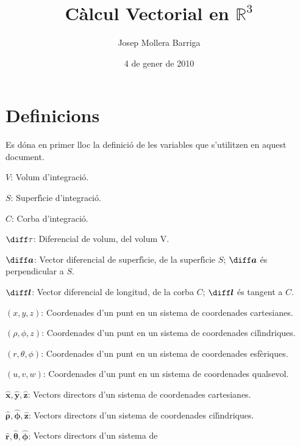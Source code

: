 \documentclass[catalan,a4paper,twoside,11pt]{article}
\begin{document}
\title{C\`{a}lcul Vectorial en $\mathbb{R}^3$}
\author{Josep Mollera Barriga}
\date{4 de gener de 2010}
\maketitle



\section{Definicions}

Es d\'{o}na  en primer lloc la definici\'{o} de les variables que s'utilitzen en aquest document.

\begin{list}{}
{\setlength{\labelwidth}{16mm}
\setlength{\leftmargin}{18mm}\setlength{\labelsep}{2mm}}
   \item[$V$:] Volum d'integraci\'{o}.
   \item[$S$:] Superf\'{\i}cie d'integraci\'{o}.
   \item[$C$:] Corba d'integraci\'{o}.
   \item[$\diff\tau$:] Diferencial de volum, del volum V.
   \item[$\boldsymbol{\diff a}$:] Vector diferencial de superf\'{\i}cie, de la superf\'{\i}cie
   $S$; $\boldsymbol{\diff a}$ \'{e}s perpendicular a $S$.
   \item[$\boldsymbol{\diff l}$:] Vector diferencial de longitud, de la corba
   $C$; $\boldsymbol{\diff l}$ \'{e}s tangent a $C$.
   \item[$(x,y,z)$:] Coordenades d'un punt en un sistema de
   coordenades cartesianes.
   \item[$(\rho,\phi,z)$:] Coordenades d'un punt en un sistema de
   coordenades cil\'{\i}ndriques.
   \item[$(r,\theta,\phi)$:] Coordenades d'un punt en un sistema de
   coordenades esf\`{e}riques.
   \item[$(u,v,w)$:] Coordenades d'un punt en un sistema de
   coordenades qualsevol.
   \item[$\boldsymbol{\hat{x}},\boldsymbol{\hat{y}},\boldsymbol{\hat{z}}$:]
   Vectors directors d'un sistema de  coordenades
   cartesianes.
   \item[$\boldsymbol{\hat{\rho}},\boldsymbol{\hat{\phi}},\boldsymbol{\hat{z}}$:] Vectors directors d'un sistema de
   coordenades cil\'{\i}ndriques.
   \item[$\boldsymbol{\hat{r}},\boldsymbol{\hat{\theta}},\boldsymbol{\hat{\phi}}$:] Vectors directors d'un sistema de

\end{list}
\end{document}
